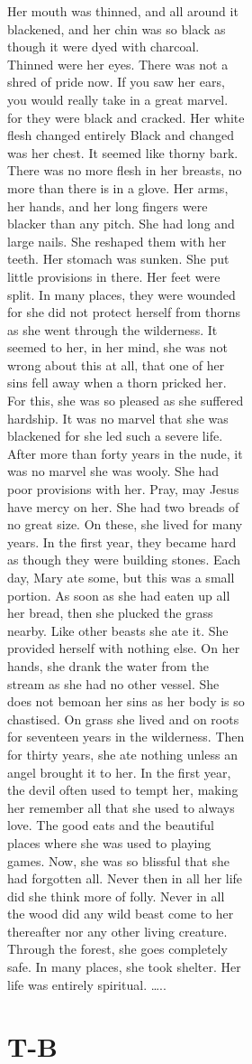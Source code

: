 \documentclass[
  letterpaper,
  DIV=11,
  numbers=noendperiod,
  oneside]{scrreprt}
\begin{document}
\begin{figure}
\begin{figure}
\begin{figure}
\begin{minipage}{0.20\linewidth}
Her mouth was thinned, and all around it {blackened}, and her chin was
so {black} {as though it were {dyed with charcoal}.} {Thinned} were her
eyes. There was not a shred of pride now. If you saw her ears, you would
really take in a great marvel. for they were {black} and cracked. {Her
{white} flesh changed entirely} {Black} and {changed} was her chest. It
seemed like thorny bark. There was no more flesh in her breasts, no more
than there is in a glove. Her arms, her hands, and her long fingers were
{blacker than any pitch.} She had long and large nails. She reshaped
them with her teeth. Her stomach was sunken. She put little provisions
in there. Her feet were split. In many places, they were wounded for she
did not protect herself from thorns as she went through the wilderness.
It seemed to her, in her mind, she was not wrong about this at all, that
one of her sins fell away when a thorn pricked her. For this, she was so
pleased as she suffered hardship. It was no marvel that she was
{blackened} for she led such a severe life. After more than forty years
in the nude, it was no marvel she was wooly. She had poor provisions
with her. Pray, may Jesus have mercy on her. She had two breads of no
great size. On these, she lived for many years. In the first year, they
became hard as though they were building stones. Each day, Mary ate
some, but this was a small portion. As soon as she had eaten up all her
bread, then she plucked the grass nearby. Like other beasts she ate it.
She provided herself with nothing else. {On her hands,} she drank the
water from the stream as she had no other vessel. She does not bemoan
her sins as her body is so chastised. On grass she lived and on roots
for seventeen years in the wilderness. Then for thirty years, she ate
nothing unless an angel brought it to her. In the first year, the devil
often used to tempt her, making her remember all that she used to always
love. The good eats and the beautiful places where she was used to
playing games. Now, she was so blissful that she had forgotten all.
Never then in all her life did she think more of folly. Never in all the
wood did any wild beast come to her thereafter nor any other living
creature. Through the forest, she goes completely safe. In many places,
she took shelter. Her life was entirely spiritual. \ldots..

\end{minipage}%
%
\begin{minipage}{0.20\linewidth}

\section{T-B}\label{t-b-1}


\end{minipage}
\end{figure}
\end{figure}
\end{figure}
\end{document}
